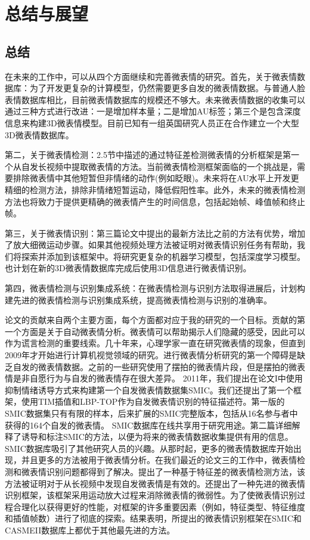 \chapter{总结与展望}\label{chap:conclusions}

\section{总结}

在未来的工作中，可以从四个方面继续和完善微表情的研究。首先，关于微表情数据库：为了开发更复杂的计算模型，仍然需要更多自发的微表情数据。与普通人脸表情数据库相比，目前微表情数据库的规模还不够大。未来微表情数据的收集可以通过三种方式进行改进：一是增加样本量；二是增加AU标签；第三个是包含深度信息来构建3D微表情模型。目前已知有一组英国研究人员正在合作建立一个大型3D微表情数据库。

第二，关于微表情检测：2.5节中描述的通过特征差检测微表情的分析框架是第一个从自发长视频中提取微表情的方法。当前微表情检测框架面临的一个挑战是，需要排除微表情中其他短暂但非情绪的动作(例如眨眼)。未来将在AU水平上开发更精细的检测方法，排除非情绪短暂运动，降低假阳性率。此外，未来的微表情检测方法也将致力于提供更精确的微表情产生的时间信息，包括起始帧、峰值帧和终止帧。

第三，关于微表情识别：第三篇论文中提出的最新方法比之前的方法有优势，增加了放大细微运动步骤。如果其他视频处理方法被证明对微表情识别任务有帮助，我们将探索并添加到该框架中。将研究更复杂的机器学习模型，包括深度学习模型。也计划在新的3D微表情数据库完成后使用3D信息进行微表情识别。

第四，微表情检测与识别集成系统：在微表情检测与识别方法取得进展后，计划构建先进的微表情检测与识别集成系统，提高微表情检测与识别的准确率。

论文的贡献来自两个主要方面，每个方面都对应于我的研究的一个目标。贡献的第一个方面是关于自动微表情分析。微表情可以帮助揭示人们隐藏的感受，因此可以作为谎言检测的重要线索。几十年来，心理学家一直在研究微表情的现象，但直到2009年才开始进行计算机视觉领域的研究。进行微表情分析研究的第一个障碍是缺乏自发的微表情数据。之前的一些研究使用了摆拍的微表情片段，但是摆拍的微表情是非自愿行为与自发的微表情存在很大差异。 2011年，我们提出在论文I中使用抑制情绪诱导方式来构建第一个自发微表情数据集SMIC。我们还提出了第一个框架，使用TIM插值和LBP-TOP作为自发微表情识别的特征描述符。第一版的SMIC数据集只有有限的样本，后来扩展的SMIC完整版本，包括从16名参与者中获得的164个自发的微表情。 SMIC数据库在线共享用于研究用途。第二篇详细解释了诱导和标注SMIC的方法，以便为将来的微表情数据收集提供有用的信息。SMIC数据库吸引了其他研究人员的兴趣。从那时起，更多的微表情数据库开始出现，并且更多的方法被用于微表情分析。在我们最近的论文三的工作中，微表情检测和微表情识别问题都得到了解决。提出了一种基于特征差的微表情检测方法，该方法被证明对于从长视频中发现自发微表情是有效的。还提出了一种先进的微表情识别框架，该框架采用运动放大过程来消除微表情的微弱性。为了使微表情识别过程合理化以获得更好的性能，对框架的许多重要因素（例如，特征类型、特征维度和插值帧数）进行了彻底的探索。结果表明，所提出的微表情识别框架在SMIC和CASMEII数据库上都优于其他最先进的方法。

